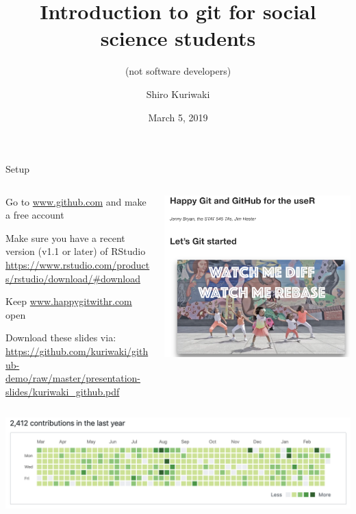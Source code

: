 \documentclass[ignorenonframetext,notes, 10pt, aspectratio=169]{beamer}
\title{\textbf{\Large{Introduction to git for social science students}}}
\subtitle{(not software developers)}
\author{Shiro Kuriwaki}
\date{March 5, 2019}
\begin{document}
\begin{frame}{Setup}
\begin{columns}[T]
\begin{column}{0.6\textwidth}
\begin{wideenumerate}
\item Go to \url{www.github.com} and make a free account
\item Make sure you have a recent version (v1.1 or later) of RStudio \url{https://www.rstudio.com/products/rstudio/download/\#download}
\item Keep \url{www.happygitwithr.com} open
\item Download these slides via: \url{https://github.com/kuriwaki/github-demo/raw/master/presentation-slides/kuriwaki_github.pdf}
\end{wideenumerate}
\end{column}
\begin{column}{0.4\textwidth}
\includegraphics[width = \linewidth]{happygit.png}
\end{column}
\end{columns}
\end{frame}

\begin{frame}
\centering
\includegraphics[width = 0.9\linewidth]{portfolio.png}
\maketitle
\end{frame}
\end{document}
